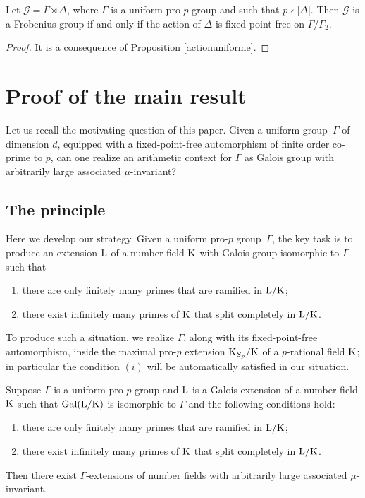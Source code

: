 \documentclass[12pt,a4paper,twoside,english]{smfart}
\def\K{{\rm K}}
\def\L{{\rm L}}
\def\G{{\mathcal G}}
\def\Gal{{\rm Gal}}
\begin{document}
  \begin{prop}
  Let $\G=\Gamma \rtimes \Delta$, where $\Gamma$ is a uniform pro-$p$ group and such that $p\nmid |\Delta|$. Then $\G$ is a Frobenius group  if and only if the action of $\Delta$ is fixed-point-free on $\Gamma/\Gamma_2$.
  \end{prop}
  
  \begin{proof}
  It is a consequence of  Proposition \ref{actionuniforme}.
  \end{proof}
 
  
 
 

 
\section{Proof of the main result}
 
 
 Let us recall the motivating question of this paper.  Given a uniform group~$\Gamma$ of dimension $d$, equipped with a fixed-point-free automorphism of finite order co-prime to $p$, can one realize an arithmetic context for $\Gamma$ as Galois group with arbitrarily large associated $\mu$-invariant?
 
 \subsection{The principle}
  
Here we develop our strategy. 
Given a uniform pro-$p$ group~$\Gamma$,
the key task is to produce an extension $\L$ of a number field $\K$ 
with Galois group isomorphic to $\Gamma$ such that 
\begin{enumerate}
\item[$(i)$] there are only finitely many primes that are ramified in $\L/\K$;
\item[$(ii)$]  there exist infinitely many primes of $\K$
that split completely in $\L/\K$. 
\end{enumerate}


To produce such a situation, we realize $\Gamma$, along with its fixed-point-free automorphism, inside the maximal pro-$p$ extension $\K_{S_p}/\K$ of a $p$-rational field $\K$; in particular the condition $(i)$ will be automatically satisfied in our situation.

\begin{prop}\label{principle}
Suppose $\Gamma$ is a uniform pro-$p$ group and $\L$ is a Galois extension of a number field $\K$ such that $\Gal(\L/\K)$ is isomorphic to $\Gamma$ and the following conditions hold:
\begin{enumerate}
\item[$(i)$] there are only finitely many primes that are ramified in $\L/\K$;
\item[$(ii)$]  there exist infinitely many primes of $\K$
that split completely in $\L/\K$. 
\end{enumerate}
Then there exist $\Gamma$-extensions of number fields with arbitrarily large associated 
$\mu$-invariant.  
\end{prop} 
 
\end{document}
